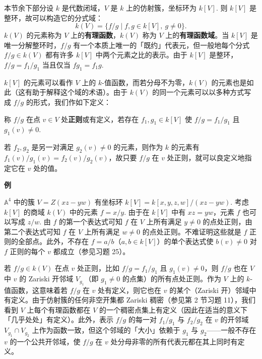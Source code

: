 本节余下部分设 \(k\) 是代数闭域，\(V\) 是 \(k\) 上的仿射簇，坐标环为 \(k[V]\). 则 \(k[V]\) 是整环，故可以构造它的分式域：
\[
k(V) = \{f/g \mid f, g \in k[V],\ g \neq 0\}.
\]
\(k(V)\) 的元素称为 \(V\) 上的\textbf{有理函数}，\(k(V)\) 称为 \(V\) 上的\textbf{有理函数域}。当 \(k[V]\) 是唯一分解整环时，\(f/g\) 有一个本质上唯一的「既约」代表元，但一般地每个分式 \(f/g \in k(V)\) 都有许多 \(k[V]\) 中两个元素之比的表示。由于 \(k[V]\) 是整环，\(f/g = f_1/g_1\) 当且仅当 \(fg_1 = f_1g\).

\(k[V]\) 的元素可以看作 \(V\) 上的 \(k\)-值函数，而若分母不为零，\(k(V)\) 的元素也是如此（这有助于解释这个域的术语）。由于 \(k(V)\) 的同一个元素可以以多种方式写成 \(f/g\) 的形式，我们作如下定义：

\begin{definition}
称 \(f/g\) 在点 \(v \in V\) 处\textbf{正则}或有定义，若存在 \(f_1, g_1 \in k[V]\) 使 \(f/g = f_1/g_1\) 且 \(g_1(v) \neq 0\).
\end{definition}

若 \(f_2, g_2\) 是另一对满足 \(g_2(v) \neq 0\) 的元素，则作为 \(k\) 的元素有 \(f_1(v)/g_1(v) = f_2(v)/g_2(v)\)，故只要 \(f/g\) 在 \(v\) 处正则，就可以良定义地指定它在 \(v\) 处的值。

\noindent\textbf{例}

\(\mathbb{A}^4\) 中的簇 \(V = Z(xz-yw)\) 有坐标环 \(k[V] = k[x,y,z,w]/(xz-yw)\). 考虑 \(k[V]\) 的商域 \(k(V)\) 中的元素 \(f = x/y\). 由于在 \(k[V]\) 中有 \(xz = yw\)，元素 \(f\) 也可以写成 \(z/w\). 由 \(f\) 的第一个表达式可知 \(f\) 在 \(V\) 上所有满足 \(y \neq 0\) 的点处正则，由第二个表达式可知 \(f\) 在 \(V\) 上所有满足 \(w \neq 0\) 的点处正则。不难证明这些就是 \(f\) 正则的全部点。此外，不存在 \(f = a/b\)（\(a, b \in k[V]\)）的单个表达式使 \(b(v) \neq 0\) 对 \(f\) 正则的每个 \(v\) 都成立（参见习题 25）。

若 \(f/g \in k(V)\) 在点 \(v\) 处正则，比如 \(f/g = f_1/g_1\) 且 \(g_1(v) \neq 0\)，则 \(f/g\) 也在 \(V\) 中 \(v\) 的 Zariski 开邻域 \(V_{g_1}\)（即 \(g_1 \neq 0\) 的点集）的所有点处正则。作为 \(V\) 上的 \(k\)-值函数，这意味着若 \(f/g\) 在 \(v\) 处有定义，则它也在 \(v\) 的某个（Zariski 开）邻域中有定义。由于仿射簇的任何非空开集都 Zariski 稠密（参见第 2 节习题 11），我们看到 \(V\) 上每个有理函数都在 \(V\) 的一个稠密点集上有定义（因此在适当的意义下「几乎处处」有定义）。此外，表示 \(f/g\) 的每一对 \(f_1/g_1\) 与 \(f_2/g_2\) 在 \(v\) 的开邻域 \(V_{g_1} \cap V_{g_2}\) 上作为函数一致，但这个邻域的「大小」依赖于 \(g_1\) 与 \(g_2\)——一般不存在 \(v\) 的一个公共开邻域，使 \(f/g\) 在 \(v\) 处分母非零的所有代表元都在其上同时有定义。


